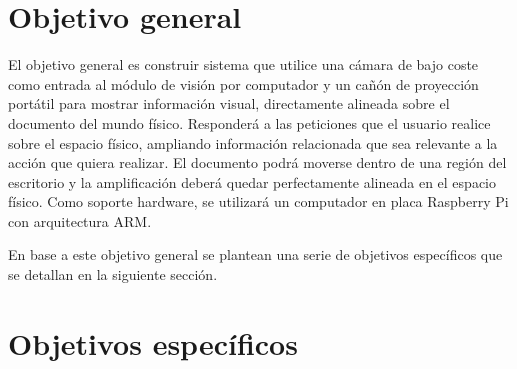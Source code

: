 \section{Objetivo general}
El objetivo general es construir sistema que utilice una cámara de bajo coste como entrada al módulo de visión por computador y un cañón de proyección portátil para mostrar información visual, directamente alineada sobre el documento del mundo físico. Responderá a las peticiones que el usuario realice sobre el espacio físico, ampliando información relacionada que sea relevante a la acción que quiera realizar. El documento podrá moverse dentro de una región del escritorio y la amplificación deberá quedar perfectamente alineada en el espacio físico. Como soporte hardware, se utilizará un computador en placa Raspberry Pi con arquitectura \acs{ARM}.


En base a este objetivo general se plantean una serie de objetivos específicos que se detallan en la siguiente sección.

\section{Objetivos específicos}

